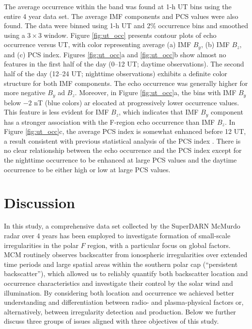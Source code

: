 The average occurrence within the band was found at 1-h UT bins using the entire 4 year data set.  The average IMF components and PCS values were also found.  The data were binned using 1-h UT and 2\% occurrence bins and smoothed using a \(3\times3\) window.  Figure \ref{fig:ut_occ} presents contour plots of echo occurrence  versus UT, with color representing average (a) IMF \(B_y\), (b) IMF \(B_z\), and (c) PCS index.  Figures \ref{fig:ut_occ}a and \ref{fig:ut_occ}b show almost no features in the first half of the day (0--12 UT; daytime observations).  The second half of the day (12--24 UT; nighttime observations) exhibits a definite color structure for both IMF components.  The echo occurrence was generally higher for more negative \(B_y\) ad \(B_z\).  Moreover, in Figure \ref{fig:ut_occ}a, the bins with IMF \(B_y\) below \(-2\) nT (blue colors) ar elocated at progressively lower occurrence values.  This feature is less evident for IMF \(B_z\), which indicates that IMF \(B_y\) component has a stronger association with the F-region echo occurrence than IMF \(B_z\).  In Figure \ref{fig:ut_occ}c, the average PCS index is somewhat enhanced before 12 UT, a result consistent with previous statistical analysis of the PCS index \citep[e.g.][Figure 4]{Troshichev2007}.  There is no clear relationship between the echo occurrence and the PCS index except for the nighttime occurrence to be enhanced at large PCS values and the daytime occurrence to be either high or low at large PCS values.


\section{Discussion}
\label{sec:p1discussion}

In this study, a comprehensive data set collected by the SuperDARN McMurdo radar over 4 years has been employed to investigate formation of small-scale irregularities in the polar \(F\) region, with a particular focus on global factors. MCM routinely observes backscatter from ionospheric irregularities over extended time periods and large spatial areas within the southern polar cap (``persistent backscatter''), which allowed us to reliably quantify both backscatter location and occurrence characteristics and investigate their control by the solar wind and illumination. By considering both location and occurrence we achieved better understanding and differentiation between radio- and plasma-physical factors or, alternatively, between irregularity detection and production. Below we further discuss three groups of issues aligned with three objectives of this study.

